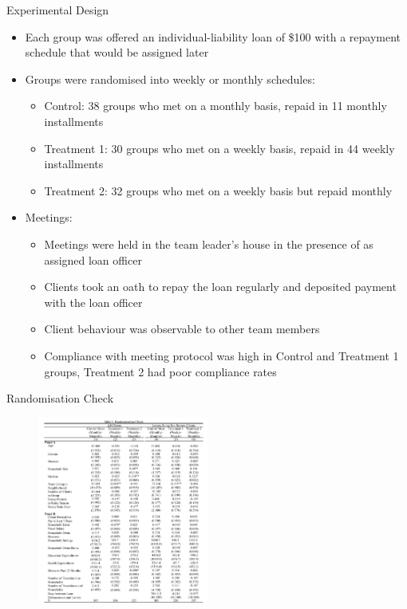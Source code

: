 \documentclass[11pt,notes=hide,aspectratio=169,mathserif]{beamer}
\begin{document}
\begin{frame}{Experimental Design}

\begin{itemize}
\item Each group was offered an individual-liability loan of \$100 with a repayment schedule that would be assigned later 
\item Groups were randomised into weekly or monthly schedules:
\begin{itemize}
    \item Control: 38 groups who met on a monthly basis, repaid in 11 monthly installments
    \item Treatment 1: 30 groups who met on a weekly basis, repaid in 44 weekly installments
    \item Treatment 2: 32 groups who met on a weekly basis but repaid monthly 
\end{itemize}
\item Meetings:
\begin{itemize}
    \item Meetings were held in the team leader's house in the presence of as assigned loan officer
    \item Clients took an oath to repay the loan regularly and deposited payment with the loan officer 
    \item Client behaviour was observable to other team members 
    \item Compliance with meeting protocol was high in Control and Treatment 1 groups, Treatment 2 had poor compliance rates 
\end{itemize}
\end{itemize}
\end{frame}

\begin{frame}{Randomisation Check}
\begin{figure}
    \centering
    \includegraphics[width=0.5\textwidth]{inputs/Fig1.png}
\end{figure}
\end{frame}
\end{document}
